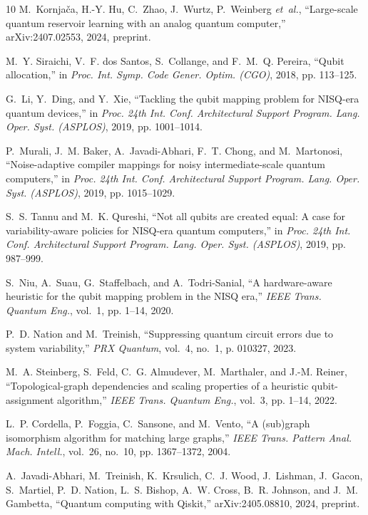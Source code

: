 \documentclass[journal]{IEEEtran}
\begin{document}
\begin{thebibliography}{10}
M.~Kornja{\v{c}}a, H.-Y. Hu, C.~Zhao, J.~Wurtz, P.~Weinberg \emph{et~al.},
  ``Large-scale quantum reservoir learning with an analog quantum computer,''
  arXiv:2407.02553, 2024, preprint.

M.~Y. Siraichi, V.~F. dos Santos, S.~Collange, and F.~M.~Q. Pereira, ``Qubit
  allocation,'' in \emph{Proc. Int. Symp. Code Gener. Optim. (CGO)}, 2018, pp.
  113--125.

G.~Li, Y.~Ding, and Y.~Xie, ``Tackling the qubit mapping problem for {NISQ}-era
  quantum devices,'' in \emph{Proc. 24th Int. Conf. Architectural Support
  Program. Lang. Oper. Syst. (ASPLOS)}, 2019, pp. 1001--1014.

P.~Murali, J.~M. Baker, A.~Javadi-Abhari, F.~T. Chong, and M.~Martonosi,
  ``Noise-adaptive compiler mappings for noisy intermediate-scale quantum
  computers,'' in \emph{Proc. 24th Int. Conf. Architectural Support Program.
  Lang. Oper. Syst. (ASPLOS)}, 2019, pp. 1015--1029.

S.~S. Tannu and M.~K. Qureshi, ``Not all qubits are created equal: A case for
  variability-aware policies for {NISQ}-era quantum computers,'' in \emph{Proc.
  24th Int. Conf. Architectural Support Program. Lang. Oper. Syst. (ASPLOS)},
  2019, pp. 987--999.

S.~Niu, A.~Suau, G.~Staffelbach, and A.~Todri-Sanial, ``A hardware-aware
  heuristic for the qubit mapping problem in the {NISQ} era,'' \emph{IEEE
  Trans. Quantum Eng.}, vol.~1, pp. 1--14, 2020.

P.~D. Nation and M.~Treinish, ``Suppressing quantum circuit errors due to
  system variability,'' \emph{PRX Quantum}, vol.~4, no.~1, p. 010327, 2023.

M.~A. Steinberg, S.~Feld, C.~G. Almudever, M.~Marthaler, and J.-M. Reiner,
  ``Topological-graph dependencies and scaling properties of a heuristic
  qubit-assignment algorithm,'' \emph{IEEE Trans. Quantum Eng.}, vol.~3, pp.
  1--14, 2022.

L.~P. Cordella, P.~Foggia, C.~Sansone, and M.~Vento, ``A (sub)graph isomorphism
  algorithm for matching large graphs,'' \emph{IEEE Trans. Pattern Anal. Mach.
  Intell.}, vol.~26, no.~10, pp. 1367--1372, 2004.

A.~Javadi-Abhari, M.~Treinish, K.~Krsulich, C.~J. Wood, J.~Lishman, J.~Gacon,
  S.~Martiel, P.~D. Nation, L.~S. Bishop, A.~W. Cross, B.~R. Johnson, and J.~M.
  Gambetta, ``Quantum computing with {Qiskit},'' arXiv:2405.08810, 2024,
  preprint.


\end{thebibliography}
\end{document}
